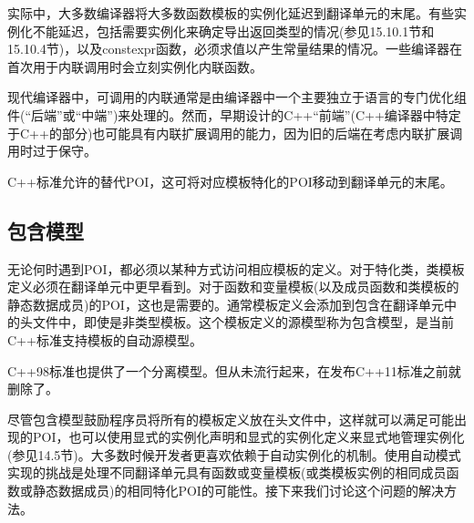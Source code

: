 实际中，大多数编译器将大多数函数模板的实例化延迟到翻译单元的末尾。有些实例化不能延迟，包括需要实例化来确定导出返回类型的情况(参见15.10.1节和15.10.4节)，以及constexpr函数，必须求值以产生常量结果的情况。一些编译器在首次用于内联调用时会立刻实例化内联函数。

\begin{tcolorbox}[colback=webgreen!5!white,colframe=webgreen!75!black]
\hspace*{0.75cm}现代编译器中，可调用的内联通常是由编译器中一个主要独立于语言的专门优化组件(“后端”或“中端”)来处理的。然而，早期设计的C++“前端”(C++编译器中特定于C++的部分)也可能具有内联扩展调用的能力，因为旧的后端在考虑内联扩展调用时过于保守。
\end{tcolorbox}

C++标准允许的替代POI，这可将对应模板特化的POI移动到翻译单元的末尾。

\subsection{包含模型}

无论何时遇到POI，都必须以某种方式访问相应模板的定义。对于特化类，类模板定义必须在翻译单元中更早看到。对于函数和变量模板(以及成员函数和类模板的静态数据成员)的POI，这也是需要的。通常模板定义会添加到包含在翻译单元中的头文件中，即使是非类型模板。这个模板定义的源模型称为包含模型，是当前C++标准支持模板的自动源模型。

\begin{tcolorbox}[colback=webgreen!5!white,colframe=webgreen!75!black]
\hspace*{0.75cm}C++98标准也提供了一个分离模型。但从未流行起来，在发布C++11标准之前就删除了。
\end{tcolorbox}

尽管包含模型鼓励程序员将所有的模板定义放在头文件中，这样就可以满足可能出现的POI，也可以使用显式的实例化声明和显式的实例化定义来显式地管理实例化(参见14.5节)。大多数时候开发者更喜欢依赖于自动实例化的机制。使用自动模式实现的挑战是处理不同翻译单元具有函数或变量模板(或类模板实例的相同成员函数或静态数据成员)的相同特化POI的可能性。接下来我们讨论这个问题的解决方法。







